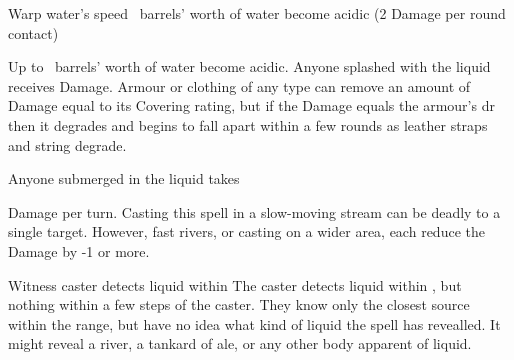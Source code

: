   {\mWater}%
  {Warp}%
  {\duplicated}%
  {water's speed}%
  {\spellArea\ barrels' worth of water become acidic (2 Damage per round contact)}%
  {
    Up to \spellArea\ barrels' worth of water become acidic.
    Anyone splashed with the liquid receives  Damage. 
    Armour or clothing of any type can remove an amount of Damage equal to its Covering rating, but if the Damage equals the armour's \gls{dr} then it degrades and begins to fall apart within a few rounds as leather straps and string degrade.

    Anyone submerged in the liquid takes \addtocounter{spelllevel}{2}  Damage per turn.
    Casting this spell in a slow-moving stream can be deadly to a single target.
    However, fast rivers, or casting on a wider area, each reduce the Damage by -1 or more.
  }

  {\mWater}%
  {Witness}%
  {\distant}%
  {}%
  {caster detects liquid within \spellRange}%
  {
    The caster detects liquid within \spellRange, but nothing within a few steps of the caster.
    They know only the closest source within the range, but have no idea what kind of liquid the spell has revealled.
    It might reveal a river, a tankard of ale, or any other body apparent of liquid.
  }
